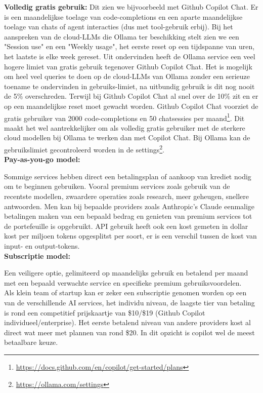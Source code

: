 \textbf{Volledig gratis gebruik:} Dit zien we bijvoorbeeld met Github Copilot Chat. Er is een maandelijkse toelage van code-completions en een aparte maandelijkse toelage van chats of agent interacties (dus met tool-gebruik erbij). Bij het aanspreken van de cloud-LLMs die Ollama ter beschikking stelt zien we een "Session use" en een "Weekly usage", het eerste reset op een tijdspanne van uren, het laatste is elke week gereset. Uit ondervinden heeft de Ollama service een veel hogere limiet van gratis gebruik tegenover Github Copilot Chat. Het is mogelijk om heel veel queries te doen op de cloud-LLMs van Ollama zonder een serieuze toename te ondervinden in gebruiks-limiet, na uitbundig gebruik is dit nog nooit de 5\% overschreden. Terwijl bij Github Copilot Chat al snel  over de 10\% zit en er op een maandelijkse reset moet gewacht worden. Github Copilot Chat voorziet de gratis gebruiker van 2000 code-completions en 50 chatsessies per maand\footnote{\href{https://docs.github.com/en/copilot/get-started/plans}{https://docs.github.com/en/copilot/get-started/plans}}.
Dit maakt het wel aantrekkelijker om als volledig gratis gebruiker met de sterkere cloud modellen bij Ollama te werken dan met Copilot Chat. Bij Ollama kan de gebruikslimiet gecontroleerd worden in de settings\footnote{\href{https://ollama.com/settings}{https://ollama.com/settings}}. \\

\textbf{Pay-as-you-go model:}

Sommige services hebben direct een betalingsplan of aankoop van krediet nodig om te beginnen gebruiken. Vooral premium services zoals gebruik van de recentste modellen, zwaardere operaties zoals research, meer geheugen, snellere antwoorden. Men kan bij bepaalde providers zoals Anthropic's Claude eenmalige betalingen maken van een bepaald bedrag en genieten van premium services tot de portefeuille is opgebruikt. API gebruik heeft ook een kost gemeten in dollar kost per miljoen tokens opgesplitst per soort, er is een verschil tussen de kost van input- en output-tokens. \\

\textbf{Subscriptie model:}

Een veiligere optie, gelimiteerd op maandelijks gebruik en betalend per maand met een bepaald verwachte service en specifieke premium gebruiksvoordelen. \\

Als klein team of startup  kan er zeker een subscriptie genomen worden op een van de verschillende AI services, het individu niveau, de laagste tier van betaling is rond een competitief prijskaartje van \$10/\$19 (Github Copilot individueel/enterprise). Het eerste betalend niveau van andere providers kost al direct wat meer met plannen van rond \$20. In dit opzicht is copilot wel de meest betaalbare keuze. \\

